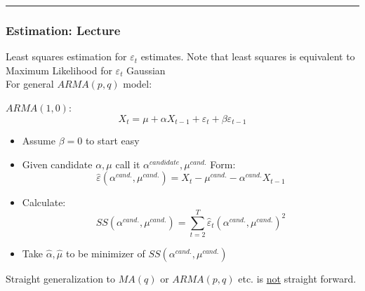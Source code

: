 \rule{\textwidth}{0.4pt}

\subsubsection{Estimation: Lecture}


Least squares estimation for $\varepsilon_t$ estimates. Note that least squares is equivalent to Maximum Likelihood for $\varepsilon_t$ Gaussian \\

For general $ARMA(p,q)$ model:

$ARMA(1,0)$: \[
X_t=\mu+\alpha X_{t-1} + \varepsilon_t+\beta\varepsilon_{t-1}
\]
\begin{itemize}
    \item Assume $\beta=0$ to start easy
    \item[] Given candidate $\alpha, \mu$ call it $\alpha^{\textit{candidate}}, \mu^{\textit{cand.}}$ Form: \[\hat{\varepsilon}(\alpha^{\textit{cand.}},\mu^{\textit{cand.}}) = X_t -\mu^{\textit{cand.}} - \alpha^{\textit{cand.}}X_{t-1}
    \]
    \item[] Calculate: \[SS(\alpha^{\textit{cand.}},\mu^{\textit{cand.}})=\sum_{t=2}^T \hat{\varepsilon}_t(\alpha^{\textit{cand.}},\mu^{\textit{cand.}} )^2 \]
    \item[] Take $\hat{\alpha}, \hat{\mu}$ to be minimizer of $SS(\alpha^{\textit{cand.}},\mu^{\textit{cand.}})$
\end{itemize}

Straight generalization to $MA(q)$ or $ARMA(p,q)$ etc. is \underline{not} straight forward.\\

